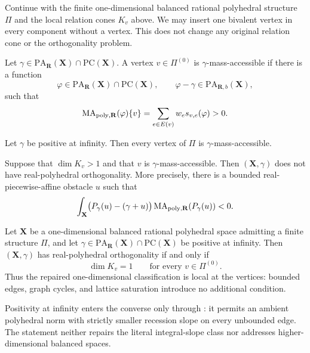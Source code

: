 
Continue with the finite one-dimensional balanced rational polyhedral
structure $\Pi$ and the local relation cones $K_v$ above.  We may insert one
bivalent vertex in every component without a vertex.  This does not change
any original relation cone or the orthogonality problem.

\begin{definition}
\label{def:frontier-polyhedral-mass-accessible}
Let $\gamma\in\mathrm{PA}_{\mathbf R}(\mathbf X)\cap
\mathrm{PC}(\mathbf X)$.  A vertex $v\in\Pi^{(0)}$ is
$\gamma$-mass-accessible if there is a function
\[
 \varphi\in\mathrm{PA}_{\mathbf R}(\mathbf X)\cap
 \mathrm{PC}(\mathbf X),
 \qquad
 \varphi-\gamma\in\mathrm{PA}_{\mathbf R,b}(\mathbf X),
\]
such that
\[
 \operatorname{MA}_{\mathrm{poly},\mathbf R}(\varphi)\{v\}
 =\sum_{e\in E(v)}w_es_{v,e}(\varphi)>0.
\]
\end{definition}

\begin{lemma}
\label{lem:frontier-polyhedral-ambient-vertex-accessibility}
Let $\gamma$ be positive at infinity.  Then every vertex of $\Pi$ is
$\gamma$-mass-accessible.
\end{lemma}

\begin{lemma}
\label{lem:frontier-polyhedral-accessible-mass-obstruction}
Suppose that $\dim K_v>1$ and that $v$ is
$\gamma$-mass-accessible.  Then $(\mathbf X,\gamma)$ does not have
real-polyhedral orthogonality.  More precisely, there is a bounded
real-piecewise-affine obstacle $u$ such that
\[
 \int_{\mathbf X}
 \bigl(P_\gamma(u)-(\gamma+u)\bigr)
 \operatorname{MA}_{\mathrm{poly},\mathbf R}(P_\gamma(u))<0.
\]
\end{lemma}

\begin{theorem}
\label{thm:frontier-polyhedral-graph-orthogonality-classification}
Let $\mathbf X$ be a one-dimensional balanced rational polyhedral space
admitting a finite structure $\Pi$, and let
$\gamma\in\mathrm{PA}_{\mathbf R}(\mathbf X)\cap
\mathrm{PC}(\mathbf X)$ be positive at infinity.  Then
$(\mathbf X,\gamma)$ has real-polyhedral orthogonality if and only if
\[
                         \dim K_v=1
                         \qquad\text{for every }v\in\Pi^{(0)}.
\]
Thus the repaired one-dimensional classification is local at the vertices:
bounded edges, graph cycles, and lattice saturation introduce no additional
condition.
\end{theorem}

Positivity at infinity enters the converse only through
: it permits an
ambient polyhedral norm with strictly smaller recession slope on every
unbounded edge.  The statement neither repairs the literal integral-slope
class nor addresses higher-dimensional balanced spaces.
